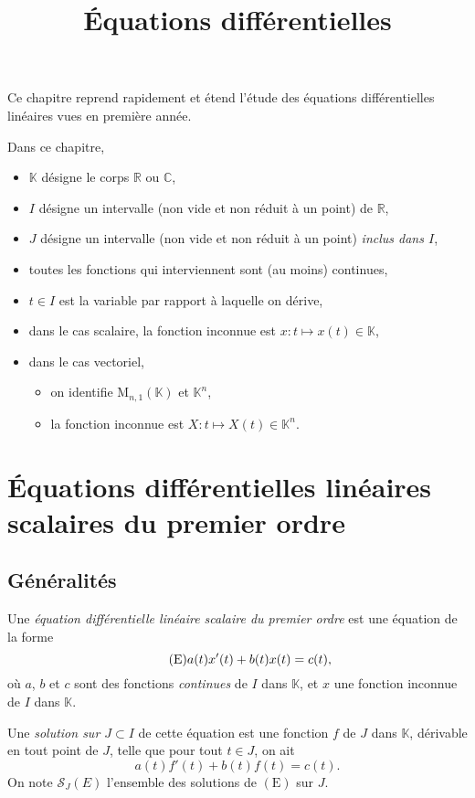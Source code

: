 \documentclass{yann}
\newcommand{\eq}[1]{\mathrm{(#1)}}
\newcommand{\mtag}[1]{\tag{$\mathrm{#1}$}}
\newcommand{\solJ}[1]{\mathcal{S}_J(#1)}
\newcommand{\VnK}{\mathrm{M}_{n,1}(𝕂)}
\begin{document}
\title{Équations différentielles}
\maketitle

Ce chapitre reprend rapidement et étend l'étude des équations différentielles linéaires vues en première année.


Dans ce chapitre,
\begin{itemize}
\item $𝕂$ désigne le corps $ℝ$ ou $ℂ$,
\item $I$ désigne un intervalle (non vide et non réduit à un point) de $ℝ$,
\item $J$ désigne un intervalle (non vide et non réduit à un point) \emph{inclus dans $I$},
\item toutes les fonctions qui interviennent sont (au moins) continues,
\item $t∈I$ est la variable par rapport à laquelle on dérive,
\item dans le cas scalaire, la fonction inconnue est $x \colon t \mapsto x(t)∈𝕂$,
\item dans le cas vectoriel,
  \begin{itemize}
  \item on identifie $\VnK$ et $𝕂^n$,
  \item la fonction inconnue est $X \colon t \mapsto X(t)∈𝕂^n$.
  \end{itemize}
\end{itemize}

\section{Équations différentielles linéaires scalaires du premier ordre}

\subsection{Généralités}


Une \emph{équation différentielle linéaire scalaire du premier ordre}
est une équation de la forme
\[\mtag{E} a(t) x'(t) + b(t) x(t) = c(t),\]
où $a$, $b$ et $c$ sont des fonctions \emph{continues} de $I$ dans $𝕂$,
et $x$ une fonction inconnue de $I$ dans $𝕂$.

Une \emph{solution sur $J⊂I$} de cette équation est une fonction $f$ de $J$ dans $𝕂$,
dérivable en tout point de $J$, telle que pour tout $t∈J$, on ait
\[a(t) f'(t) + b(t) f(t) = c(t).\]
On note $\solJ{E}$ l'ensemble des solutions de $\eq{E}$ sur $J$.
\end{document}
